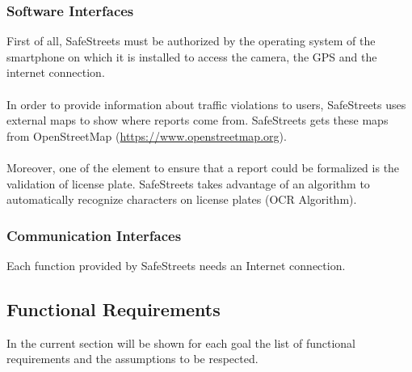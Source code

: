 \documentclass{article}
\begin{document}
			\subsubsection{Software Interfaces}
				First of all, SafeStreets must be authorized by the operating system of the smartphone on which it is installed to access the camera, the GPS and the internet connection.\\
				\\
				In order to provide information about traffic violations to users, SafeStreets uses external maps to show where reports come from. SafeStreets gets these maps from OpenStreetMap (\url{https://www.openstreetmap.org}).\\
				\\
				Moreover, one of the element to ensure that a report could be formalized is the validation of license plate. SafeStreets takes advantage of an algorithm to automatically recognize characters on license plates (OCR Algorithm).
				
				
			\subsubsection{Communication Interfaces}
				Each function provided by SafeStreets needs an Internet connection.
		\subsection{Functional Requirements}
			In the current section will be shown for each goal the list of functional requirements and the assumptions to be respected.
			
\end{document}
